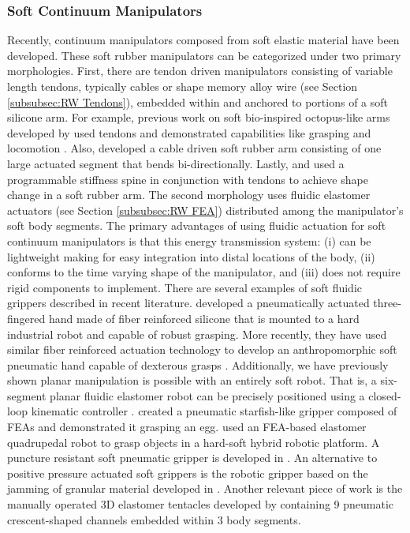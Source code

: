 \subsubsection{Soft Continuum Manipulators}
Recently, continuum manipulators composed from soft elastic material have been developed.
These soft rubber manipulators can be categorized under two primary morphologies.
First, there are tendon driven manipulators consisting of variable length tendons, typically cables or shape memory alloy wire (see Section \ref{subsubsec:RW Tendons}), embedded within and anchored to portions of a soft silicone arm.
For example, previous work on soft bio-inspired octopus-like arms developed by \citet{calisti2010study} used tendons and demonstrated capabilities like grasping and locomotion \citep{laschi2012soft, calisti2011octopus}.
Also, \citet{wang2013visual} developed a cable driven soft rubber arm consisting of one large actuated segment that bends bi-directionally.
Lastly, \citet{mcevoy14shape} and \citet{mcevoy2014thermoplastic} used a programmable stiffness spine in conjunction with tendons to achieve shape change in a soft rubber arm.
The second morphology uses fluidic elastomer actuators (see Section \ref{subsubsec:RW FEA}) distributed among the manipulator's soft body segments.
The primary advantages of using fluidic actuation for soft continuum manipulators is that this energy transmission system: (i) can be lightweight making for easy integration into distal locations of the body, (ii) conforms to the time varying shape of the manipulator, and (iii) does not require rigid components to implement.
There are several examples of soft fluidic grippers described in recent literature.
\citet{deimel2013compliant} developed a pneumatically actuated three-fingered hand made of fiber reinforced silicone that is mounted to a hard industrial robot and capable of robust grasping.
More recently, they have used similar fiber reinforced actuation technology to develop an anthropomorphic soft pneumatic hand capable of dexterous grasps \citep{deimel2014novel}.
Additionally, we have previously shown planar manipulation is possible with an entirely soft robot. That is, a six-segment planar fluidic elastomer robot can be precisely positioned using a closed-loop kinematic controller \citep{marchese2014design, marchese2014whole, katzschmann2015autonomous}.
\citet{ilievski2011soft} created a pneumatic starfish-like gripper composed of FEAs and demonstrated it grasping an egg.
\citet{Stokes2014hybrid} used an FEA-based elastomer quadrupedal robot to grasp objects in a hard-soft hybrid robotic platform.
A puncture resistant soft pneumatic gripper is developed in \citet{shepherd2013soft}.
An alternative to positive pressure actuated soft grippers is the robotic gripper based on the jamming of granular material developed in \citet{brown2010universal}.
Another relevant piece of work is the manually operated 3D elastomer tentacles developed by \citet{martinez2013robotic} containing 9 pneumatic crescent-shaped channels embedded within 3 body segments.

